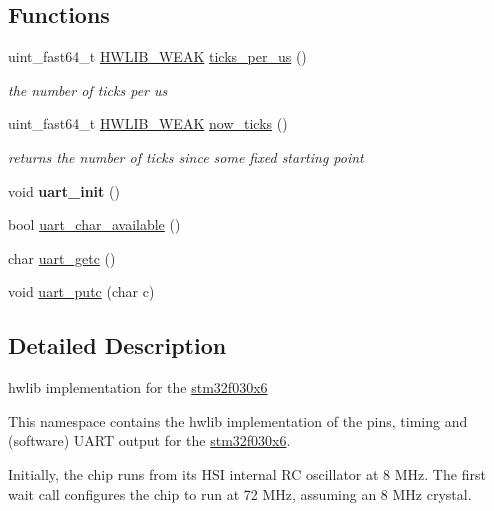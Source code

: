\subsection*{Functions}
\begin{DoxyCompactItemize}
\item 
uint\+\_\+fast64\+\_\+t \hyperlink{hwlib-defines_8hpp_a04be4340016df60d6636c1d1c6d94fc9}{H\+W\+L\+I\+B\+\_\+\+W\+E\+AK} \hyperlink{namespacestm32f030x6_a27427bc351a5ba91ea69a3be5d1b27de}{ticks\+\_\+per\+\_\+us} ()
\begin{DoxyCompactList}\small\item\em the number of ticks per us \end{DoxyCompactList}\item 
uint\+\_\+fast64\+\_\+t \hyperlink{hwlib-defines_8hpp_a04be4340016df60d6636c1d1c6d94fc9}{H\+W\+L\+I\+B\+\_\+\+W\+E\+AK} \hyperlink{namespacestm32f030x6_ae284e9d77fe0c507568353cc5f0129f6}{now\+\_\+ticks} ()
\begin{DoxyCompactList}\small\item\em returns the number of ticks since some fixed starting point \end{DoxyCompactList}\item 
\mbox{\label{namespacestm32f030x6_a8729318a90dba3e0070f88afcb9d4d61}} 
void {\bfseries uart\+\_\+init} ()
\item 
bool \hyperlink{namespacestm32f030x6_a6d4aa0ce390d76e08a757100ddc0c7e8}{uart\+\_\+char\+\_\+available} ()
\item 
char \hyperlink{namespacestm32f030x6_ae4ffd99ebca764be1c506dbebb59eb07}{uart\+\_\+getc} ()
\item 
void \hyperlink{namespacestm32f030x6_ac4348e3318c69d76563ecfde8655d833}{uart\+\_\+putc} (char c)
\end{DoxyCompactItemize}


\subsection{Detailed Description}
hwlib implementation for the \hyperlink{namespacestm32f030x6}{stm32f030x6}

This namespace contains the hwlib implementation of the pins, timing and (software) U\+A\+RT output for the \hyperlink{namespacestm32f030x6}{stm32f030x6}.

Initially, the chip runs from its H\+SI internal RC oscillator at 8 M\+Hz. The first wait call configures the chip to run at 72 M\+Hz, assuming an 8 M\+Hz crystal.

